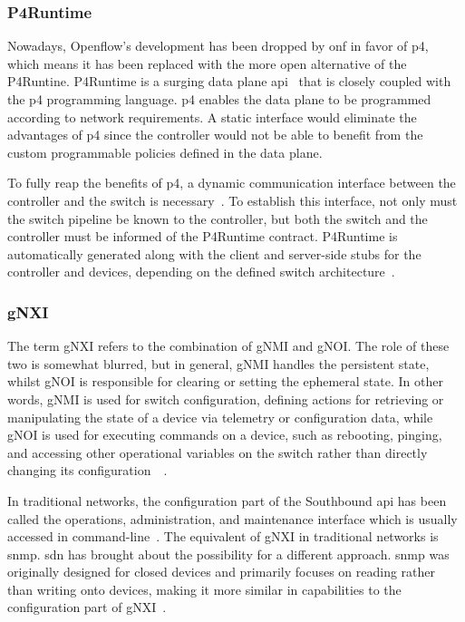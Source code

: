 \subsubsection{P4Runtime}
Nowadays, Openflow's development has been dropped by \gls{onf} in favor of \gls{p4}, which means it has been replaced with the more open alternative of the P4Runtine. P4Runtime is a surging data plane \gls{api}~\cite{hauser_survey_2021} that is closely coupled with the \gls{p4} programming language. \gls{p4} enables the data plane to be programmed according to network requirements. A static interface would eliminate the advantages of \gls{p4} since the controller would not be able to benefit from the custom programmable policies defined in the data plane. 

To fully reap the benefits of \gls{p4}, a dynamic communication interface between the controller and the switch is necessary~\cite{peterson_software-defined_2021}. To establish this interface, not only must the switch pipeline be known to the controller, but both the switch and the controller must be informed of the P4Runtime contract. P4Runtime is automatically generated along with the client and server-side stubs for the controller and devices, depending on the defined switch architecture~\cite{peterson_software-defined_2021}.

\subsubsection{gNXI}
The term gNXI refers to the combination of gNMI and gNOI. The role of these two is somewhat blurred, but in general, gNMI handles the persistent state, whilst gNOI is responsible for clearing or setting the ephemeral state. In other words, gNMI is used for switch configuration, defining actions for retrieving or manipulating the state of a device via telemetry or configuration data, while gNOI is used for executing commands on a device, such as rebooting, pinging, and accessing other operational variables on the switch rather than directly changing its configuration~\cite{peterson_software-defined_2021}~\cite{noauthor_openconfig_nodate}.

In traditional networks, the configuration part of the Southbound api has been called the operations, administration, and maintenance interface which is usually accessed in command-line~\cite{peterson_software-defined_2021}. The equivalent of gNXI in traditional networks is \gls{snmp}. \gls{sdn} has brought about the possibility for a different approach. \gls{snmp} was originally designed for closed devices and primarily focuses on reading rather than writing onto devices, making it more similar in capabilities to the configuration part of gNXI~\cite{peterson_software-defined_2021}.

